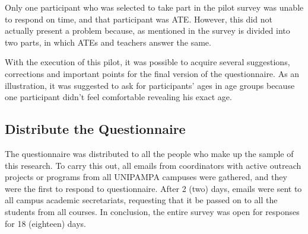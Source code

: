 Only one participant who was selected to take part in the pilot survey was unable to respond on time, and that participant was \ac{ATE}. However, this did not actually present a problem because, as mentioned in  the survey is divided into two parts, in which \acp{ATE} and teachers answer the same.


With the execution of this pilot, it was possible to acquire several suggestions, corrections and important points for the final version of the questionnaire.
As an illustration, it was suggested to ask for participants' ages in age groups because one participant didn't feel comfortable revealing his exact age.
\subsection{Distribute the Questionnaire}\label{sec:survey-distribute}


The questionnaire was distributed to all the people who make up the sample of this research.
To carry this out, all emails from coordinators with active outreach projects or programs from all \ac{UNIPAMPA} campuses were gathered, and they were the first to respond to questionnaire.
After 2 (two) days, emails were sent to all campus academic secretariats, requesting that it be passed on to all the students from all courses. In conclusion, the entire survey was open for responses for 18 (eighteen) days.

